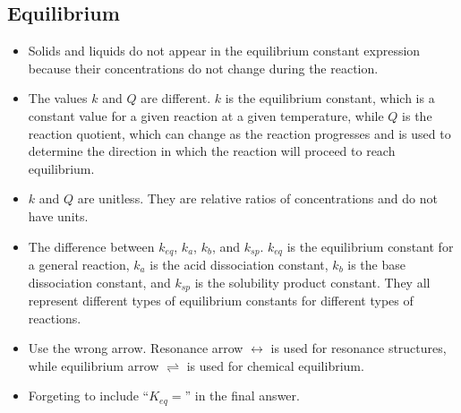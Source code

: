     \subsection{Equilibrium}
        \begin{itemize}
            \item Solids and liquids do not appear in the equilibrium constant expression because their concentrations do not change during the reaction.
            \item The values $k$ and $Q$ are different. $k$ is the equilibrium constant, which is a constant value for a given reaction at a given temperature, while $Q$ is the reaction quotient, which can change as the reaction progresses and is used to determine the direction in which the reaction will proceed to reach equilibrium.
            \item $k$ and $Q$ are unitless. They are relative ratios of concentrations and do not have units.
            \item The difference between $k_{eq}$, $k_a$, $k_b$, and $k_{sp}$. $k_{eq}$ is the equilibrium constant for a general reaction, $k_a$ is the acid dissociation constant, $k_b$ is the base dissociation constant, and $k_{sp}$ is the solubility product constant. They all represent different types of equilibrium constants for different types of reactions.
            \item Use the wrong arrow. Resonance arrow $\leftrightarrow$ is used for resonance structures, while equilibrium arrow $\rightleftharpoons$ is used for chemical equilibrium.
            \item Forgeting to include ``$K_{eq}=$'' in the final answer.
        \end{itemize}

